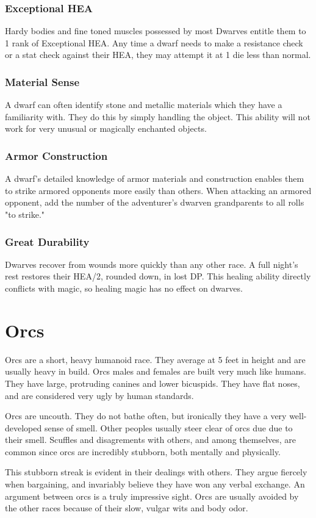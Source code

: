 \begin{multicols*}{2}
\subsubsection{Exceptional HEA}
Hardy bodies and fine toned muscles possessed by most Dwarves entitle them to 1 rank of Exceptional HEA. Any time a dwarf needs to make a resistance check or a stat check against their HEA, they may attempt it at 1 die less than normal.
\subsubsection{Material Sense}
A dwarf can often identify stone and metallic materials which they have a familiarity with. They do this by simply handling the object. This ability will not work for very unusual or magically enchanted objects.
\subsubsection{Armor Construction}
A dwarf's detailed knowledge of armor materials and construction enables them to strike armored opponents more easily than others. When attacking an armored opponent, add the number of the adventurer's dwarven grandparents to all rolls "to strike."
\subsubsection{Great Durability}
Dwarves recover from wounds more quickly than any other race. A full night's rest restores their HEA/2, rounded down, in lost DP. This healing ability directly conflicts with magic, so healing magic has no effect on dwarves.
\makeline
\section{Orcs}
Orcs are a short, heavy humanoid race. They average at 5 feet in height and are usually heavy in build. Orcs males and females are built very much like humans. They have large, protruding canines and lower bicuspids. They have flat noses, and are considered very ugly by human standards.

Orcs are uncouth. They do not bathe often, but ironically they have a very well-developed sense of smell. Other peoples usually steer clear of orcs due due to their smell. Scuffles and disagrements with others, and among themselves, are common since orcs are incredibly stubborn, both mentally and physically.

This stubborn streak is evident in their dealings with others. They argue fiercely when bargaining, and invariably believe they have won any verbal exchange. An argument between orcs is a truly impressive sight. Orcs are usually avoided by the other races because of their slow, vulgar wits and body odor.


\end{multicols*}
